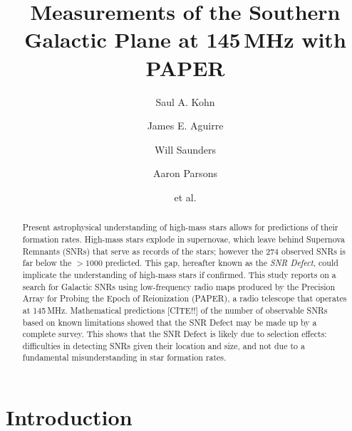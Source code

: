 \documentclass[preprint2,epsf,epsfig,graphics]{emulateapj}
\begin{document}
\title{Measurements of the Southern Galactic Plane at 145\,MHz with PAPER}

\author{Saul A. Kohn}
\author{James E. Aguirre}
\author{Will Saunders}
\author{Aaron Parsons}
\author{et al.}



\begin{abstract}
Present astrophysical understanding of high-mass stars allows for predictions of their formation rates.  High-mass stars explode in supernovae, which leave behind Supernova Remnants (SNRs) that serve as records of the stars; however the 274 observed SNRs is far below the $>1000$ predicted.  This gap, hereafter known as the \textit{SNR Defect}, could implicate the understanding of high-mass stars if confirmed. This study reports on a search for Galactic SNRs using low-frequency radio maps produced by the Precision Array for Probing the Epoch of Reionization (PAPER), a radio telescope that operates at 145\,MHz.  
Mathematical predictions {\color{red}[CITE!!]} of the number of observable SNRs based on known limitations showed that the SNR Defect may be made up by a complete survey.  This shows that the SNR Defect is likely due to selection effects: difficulties in detecting SNRs given their location and size, and not due to a fundamental misunderstanding in star formation rates.
\end{abstract}

\section{Introduction}
\end{document}
